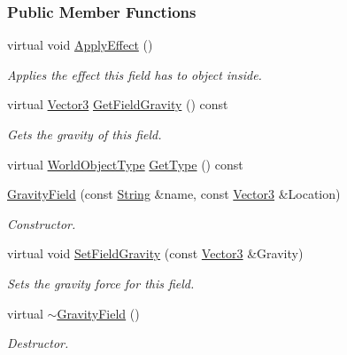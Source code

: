 \subsubsection*{Public Member Functions}
\begin{DoxyCompactItemize}
\item 
virtual void \hyperlink{classMezzanine_1_1GravityField_a53aee6679088fb6151e5cb6e82a09fb7}{ApplyEffect} ()
\begin{DoxyCompactList}\small\item\em Applies the effect this field has to object inside. \item\end{DoxyCompactList}\item 
virtual \hyperlink{classMezzanine_1_1Vector3}{Vector3} \hyperlink{classMezzanine_1_1GravityField_ad37d2c94bdabf0412e35ed59ad74e8c9}{GetFieldGravity} () const 
\begin{DoxyCompactList}\small\item\em Gets the gravity of this field. \item\end{DoxyCompactList}\item 
virtual \hyperlink{namespaceMezzanine_a30335416fc857844e8360c84d1d1b56c}{WorldObjectType} \hyperlink{classMezzanine_1_1GravityField_ae8c07e694ebcbcb226c1375bec3772b4}{GetType} () const 
\item 
\hyperlink{classMezzanine_1_1GravityField_aff8a73a59ad999b49f39c4bfb564fed3}{GravityField} (const \hyperlink{namespaceMezzanine_acf9fcc130e6ebf08e3d8491aebcf1c86}{String} \&name, const \hyperlink{classMezzanine_1_1Vector3}{Vector3} \&Location)
\begin{DoxyCompactList}\small\item\em Constructor. \item\end{DoxyCompactList}\item 
virtual void \hyperlink{classMezzanine_1_1GravityField_a426b69dcfd3476029ebadea1ee4e0ea3}{SetFieldGravity} (const \hyperlink{classMezzanine_1_1Vector3}{Vector3} \&Gravity)
\begin{DoxyCompactList}\small\item\em Sets the gravity force for this field. \item\end{DoxyCompactList}\item 
virtual \hyperlink{classMezzanine_1_1GravityField_a53fe69bb37458dce9fca8df1215d739e}{$\sim$GravityField} ()
\begin{DoxyCompactList}\small\item\em Destructor. \item\end{DoxyCompactList}\end{DoxyCompactItemize}
